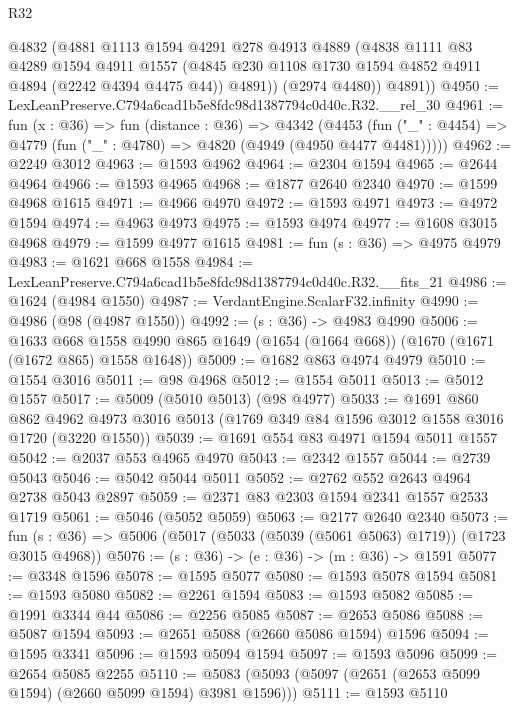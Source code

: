 \begin{lexlean}{R32}
\begin{coremodule}
          @4832
          (@4881
            @1113
            @1594
            @4291
            @278
            @4913
            @4889
            (@4838
              @1111
              @83
              @4289
              @1594
              @4911
              @1557
              (@4845 @230 @1108 @1730 @1594 @4852 @4911 @4894 (@2242 @4394 @4475 @44))
              @4891))
          (@2974 @4480))
        @4891))
@4950 := LexLeanPreserve.C794a6cad1b5e8fdc98d1387794c0d40c.R32.__rel_30
@4961 := fun (x : @36) =>
  fun (distance : @36) =>
  @4342
    (@4453 (fun ("_" : @4454) => @4779 (fun ("_" : @4780) => @4820 (@4949 (@4950 @4477 @4481)))))
@4962 := @2249 @3012
@4963 := @1593 @4962
@4964 := @2304 @1594
@4965 := @2644 @4964
@4966 := @1593 @4965
@4968 := @1877 @2640 @2340
@4970 := @1599 @4968 @1615
@4971 := @4966 @4970
@4972 := @1593 @4971
@4973 := @4972 @1594
@4974 := @4963 @4973
@4975 := @1593 @4974
@4977 := @1608 @3015 @4968
@4979 := @1599 @4977 @1615
@4981 := fun (s : @36) => @4975 @4979
@4983 := @1621 @668 @1558
@4984 := LexLeanPreserve.C794a6cad1b5e8fdc98d1387794c0d40c.R32.__fits_21
@4986 := @1624 (@4984 @1550)
@4987 := VerdantEngine.ScalarF32.infinity
@4990 := @4986 (@98 (@4987 @1550))
@4992 := (s : @36) -> @4983 @4990
@5006 := @1633
    @668
    @1558
    @4990
    @865
    @1649
    (@1654 (@1664 @668))
    (@1670 (@1671 (@1672 @865) @1558 @1648))
@5009 := @1682 @863 @4974 @4979
@5010 := @1554 @3016
@5011 := @98 @4968
@5012 := @1554 @5011
@5013 := @5012 @1557
@5017 := @5009 (@5010 @5013) (@98 @4977)
@5033 := @1691
    @860
    @862
    @4962
    @4973
    @3016
    @5013
    (@1769 @349 @84 @1596 @3012 @1558 @3016 @1720 (@3220 @1550))
@5039 := @1691 @554 @83 @4971 @1594 @5011 @1557
@5042 := @2037 @553 @4965 @4970
@5043 := @2342 @1557
@5044 := @2739 @5043
@5046 := @5042 @5044 @5011
@5052 := @2762 @552 @2643 @4964 @2738 @5043 @2897
@5059 := @2371 @83 @2303 @1594 @2341 @1557 @2533 @1719
@5061 := @5046 (@5052 @5059)
@5063 := @2177 @2640 @2340
@5073 := fun (s : @36) => @5006 (@5017 (@5033 (@5039 (@5061 @5063) @1719)) (@1723 @3015 @4968))
@5076 := (s : @36) -> (e : @36) -> (m : @36) -> @1591
@5077 := @3348 @1596
@5078 := @1595 @5077
@5080 := @1593 @5078 @1594
@5081 := @1593 @5080
@5082 := @2261 @1594
@5083 := @1593 @5082
@5085 := @1991 @3344 @44
@5086 := @2256 @5085
@5087 := @2653 @5086
@5088 := @5087 @1594
@5093 := @2651 @5088 (@2660 @5086 @1594) @1596
@5094 := @1595 @3341
@5096 := @1593 @5094 @1594
@5097 := @1593 @5096
@5099 := @2654 @5085 @2255
@5110 := @5083 (@5093 (@5097 (@2651 (@2653 @5099 @1594) (@2660 @5099 @1594) @3981 @1596)))
@5111 := @1593 @5110

\end{coremodule}
\end{lexlean}
